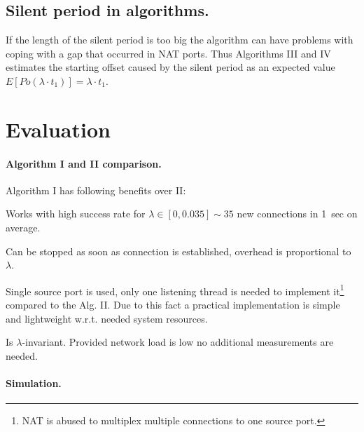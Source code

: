 \documentclass{llncs}
\begin{document}
\subsection{Silent period in algorithms.} If the length of the silent period is too big
the algorithm can have problems with coping with a gap that occurred in NAT ports. Thus 
Algorithms III and IV estimates the starting offset caused by the silent period as an
expected value $E[Po(\lambda \cdot t_1)] = \lambda\cdot t_1$.

\section{Evaluation}

\paragraph{Algorithm I and II comparison.} 
Algorithm I has following benefits over II:
\begin{compactitem}
 \item Works with high success rate for $\lambda \in [0, 0.035] \sim 35$ new connections in 1~sec on average.
 \item Can be stopped as soon as connection is established, overhead is proportional to~$\lambda$.
 \item Single source port is used, only one listening thread is needed to implement
it\footnote{NAT is abused to multiplex multiple connections to one source port.} compared to the Alg. II.
Due to this fact a practical implementation is simple and lightweight w.r.t. needed system resources.
 \item Is $\lambda$-invariant. Provided network load is low no additional measurements are needed.
\end{compactitem}

\paragraph{Simulation.}
\end{document}

